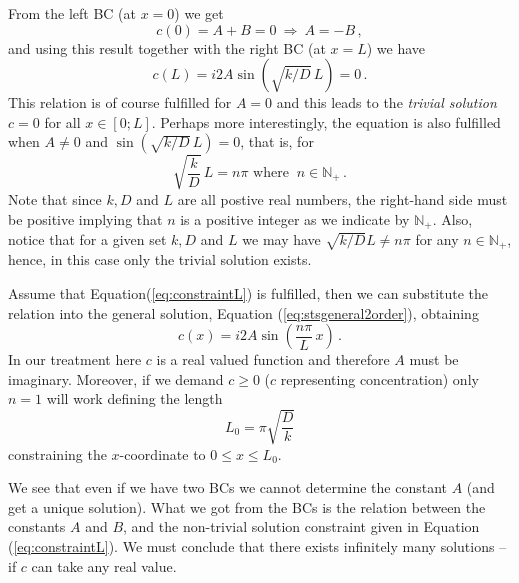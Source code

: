 From the left BC (at $x=0$) we get
\begin{equation}
  c(0) = A + B = 0 \ \Rightarrow \ A = -B   \, ,
\end{equation}
and using this result together with the right BC (at $x=L$) we have
\begin{equation}
  c(L) = i2A\sin\left(\sqrt{k/D}\,L\right) = 0 \, .
\end{equation}
This relation is of course fulfilled for $A=0$ and this leads to the 
\emph{trivial solution}  $c=0$ for all $x \in [0;L]$. Perhaps more interestingly, the equation is also 
fulfilled when $A\neq 0$ and $\sin(\sqrt{k/D}\,L ) = 0$, that is, for
\begin{equation}
  \label{eq:constraintL}
	\sqrt{\frac{k}{D}} \, L = n\pi \text{ where } \ n \in \mathbb{N}_+ \, .
\end{equation}
Note that since $k, D$ and $L$ are all postive real numbers, the right-hand side must be positive 
implying that $n$ is a positive integer as we indicate by $\mathbb{N}_+$. Also, notice that for a
given set $k, D$ and $L$ we may have $\sqrt{k/D} L \neq n \pi$ for any $n \in \mathbb{N}_+$, 
hence, in this case only the trivial solution exists. 

Assume that Equation(\ref{eq:constraintL}) is fulfilled, then we can substitute the 
relation into the general solution, Equation (\ref{eq:stsgeneral2order}), obtaining    
\begin{equation}
\label{eq:gensolfirst}
c(x) = i2A \sin\left(\frac{n \pi}{L} \, x \right)  \, .
\end{equation}
In our treatment here $c$ is a real valued function and therefore $A$ must be imaginary. 
Moreover, if we demand $c \geq 0$ ($c$ representing concentration) only $n=1$  will work 
defining the length    
\begin{equation}
  \label{eq:L0}
  L_0 = \pi  \sqrt{\frac{D}{k}} 
\end{equation}
constraining the $x$-coordinate to $0 \leq x \leq L_0$. 

We see that even if we have two BCs we cannot determine the constant $A$ 
(and get a unique solution). 
What we got from the BCs is the relation between the constants $A$ and $B$, 
and the non-trivial solution constraint given in Equation (\ref{eq:constraintL}). 
We must conclude that there exists infinitely many solutions -- if $c$ can take any real value. 

